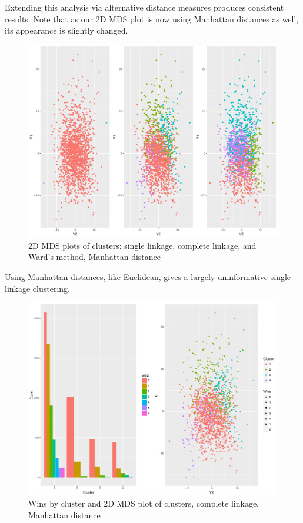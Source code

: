 \documentclass[10pt,a4paper, hidelinks]{article} %
\begin{document}
Extending this analysis via alternative distance measures produces consistent results.  Note that as our 2D MDS plot is now using Manhattan distances as well, its appearance is slightly changed.

\begin{figure}[H]
	\centering
	\includegraphics[width=0.7\linewidth]{"../fig/manheightan"}
	\caption{2D MDS plots of clusters: single linkage, complete linkage, and Ward's method, Manhattan distance}
\end{figure}

Using Manhattan distances, like Euclidean, gives a largely uninformative single linkage clustering.

\begin{figure}[H]
	\centering
	\includegraphics[width=0.7\linewidth]{../fig/comp2}
	\caption{Wins by cluster and 2D MDS plot of clusters, complete linkage, Manhattan distance}
\end{figure}
\end{document}

